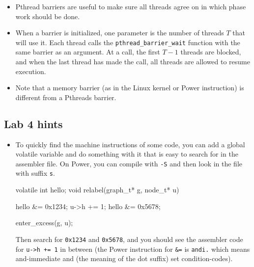 \documentclass{forsete}
\begin{document}
{\begin{itemize}
\begin{ccode}
{	c *= 2; // double the capacity
	b = realloc(a, c * sizeof(a[0]));
	if (b == NULL)
		error("no memory");
	a = b;
}

a[i].x = x;
a[i].y = y;
i += 1;
\end{ccode}
When the array is no longer needed, you call \verb!free(a)!, but you should not
free the old array after using \verb.realloc., since that is taken care of by
\verb.realloc. if needed (it can happen that \verb.realloc. found available memory
after the end of \verb.a. so no free was needed).

\item Pthread barriers are useful to make sure all threads agree on 
in which phase work should be done. 

\item When a barrier is initialized, one parameter is the number of
threads $T$ that will use it. Each thread calls the
\verb.pthread_barrier_wait. 
function with the same barrier as an 
argument. At a call, the first $T-1$ threads are blocked, and when the last thread has
made the call, all threads are allowed to resume execution.

\item Note that a memory barrier (as in the Linux kernel or Power instruction) is different from a Pthreads barrier.


\end{itemize}


\subsection*{Lab 4 hints}
\begin{itemize}
\item To quickly find the machine instructions of some code, you can 
add a global volatile variable and do something with it that is easy to search for in
the assembler file.
On Power, you can compile with \verb.-S. and then look in the file with suffix \verb.s.. 
\begin{ccode}
volatile int hello;
void relabel(graph_t* g, node_t* u)
{
	hello &= 0x1234;
        u->h += 1;
	hello &= 0x5678;

        enter_excess(g, u);
}
\end{ccode}
Then search for \verb.0x1234. and \verb.0x5678., and you should see the assembler code for \verb.u->h += 1. in
between (the Power instruction for \verb.&=. is \verb!andi.! which means and-immediate and (the meaning of the dot suffix) set condition-codes).





\end{itemize}}
\end{document}

